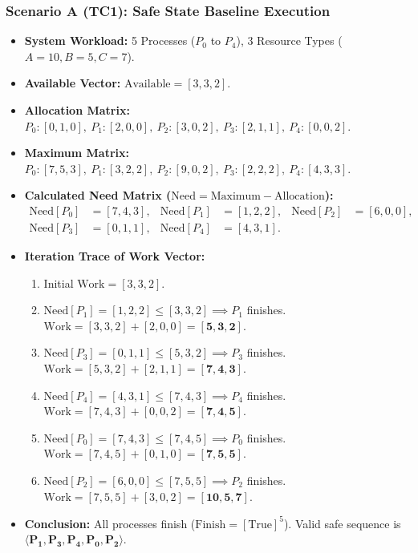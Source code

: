 \documentclass[11pt,a4paper]{article}
\begin{document}
\subsubsection{Scenario A (TC1): Safe State Baseline Execution}
\begin{itemize}[leftmargin=1.5em,noitemsep]
    \item \textbf{System Workload:} 5 Processes ($P_0$ to $P_4$), 3 Resource Types ($A=10, B=5, C=7$).
    \item \textbf{Available Vector:} $\text{Available} = [3, 3, 2]$.
    \item \textbf{Allocation Matrix:} $P_0: [0, 1, 0], \ P_1: [2, 0, 0], \ P_2: [3, 0, 2], \ P_3: [2, 1, 1], \ P_4: [0, 0, 2]$.
    \item \textbf{Maximum Matrix:} $P_0: [7, 5, 3], \ P_1: [3, 2, 2], \ P_2: [9, 0, 2], \ P_3: [2, 2, 2], \ P_4: [4, 3, 3]$.
    \item \textbf{Calculated Need Matrix ($\text{Need} = \text{Maximum} - \text{Allocation}$):}
    \begin{align*}
        \text{Need}[P_0] &= [7, 4, 3], & \text{Need}[P_1] &= [1, 2, 2], & \text{Need}[P_2] &= [6, 0, 0], \\
        \text{Need}[P_3] &= [0, 1, 1], & \text{Need}[P_4] &= [4, 3, 1]. & &
    \end{align*}
    \item \textbf{Iteration Trace of Work Vector:}
    \begin{enumerate}[noitemsep]
        \item Initial $\text{Work} = [3, 3, 2]$.
        \item $\text{Need}[P_1] = [1, 2, 2] \le [3, 3, 2] \implies P_1$ finishes. $\text{Work} = [3, 3, 2] + [2, 0, 0] = \mathbf{[5, 3, 2]}$.
        \item $\text{Need}[P_3] = [0, 1, 1] \le [5, 3, 2] \implies P_3$ finishes. $\text{Work} = [5, 3, 2] + [2, 1, 1] = \mathbf{[7, 4, 3]}$.
        \item $\text{Need}[P_4] = [4, 3, 1] \le [7, 4, 3] \implies P_4$ finishes. $\text{Work} = [7, 4, 3] + [0, 0, 2] = \mathbf{[7, 4, 5]}$.
        \item $\text{Need}[P_0] = [7, 4, 3] \le [7, 4, 5] \implies P_0$ finishes. $\text{Work} = [7, 4, 5] + [0, 1, 0] = \mathbf{[7, 5, 5]}$.
        \item $\text{Need}[P_2] = [6, 0, 0] \le [7, 5, 5] \implies P_2$ finishes. $\text{Work} = [7, 5, 5] + [3, 0, 2] = \mathbf{[10, 5, 7]}$.
    \end{enumerate}
    \item \textbf{Conclusion:} All processes finish ($\text{Finish} = [\text{True}]^5$). Valid safe sequence is $\mathbf{\langle P_1, P_3, P_4, P_0, P_2 \rangle}$.
\end{itemize}
\end{document}
